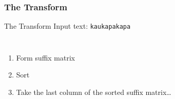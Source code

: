 \documentclass{beamer}
\begin{document}
  \subsubsection{The Transform}
  \begin{frame}{The Transform}
    Input text: \texttt{kaukapakapa}
    \begin{columns}[c] %
      \begin{enumerate}
      \item<2-> Form suffix matrix
      \item<3-> Sort
      \item<4-> Take the last column of the sorted suffix matrix\ldots
      \end{enumerate}


\end{columns}
\end{frame}
\end{document}
